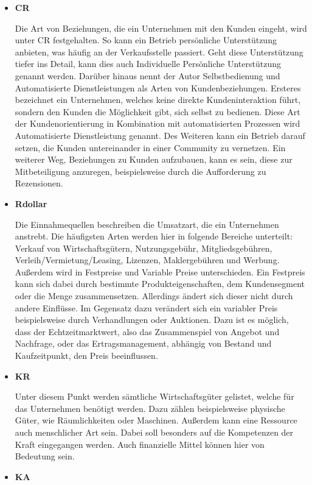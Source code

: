 \begin{itemize}
	\item \textbf{\ac{CR}}
	
	Die Art von Beziehungen, die ein Unternehmen mit den Kunden eingeht, wird unter \acs{CR} festgehalten. So kann ein Betrieb persönliche Unterstützung anbieten, was häufig an der Verkaufsstelle passiert. Geht diese Unterstützung tiefer ins Detail, kann dies auch Individuelle Persönliche Unterstützung genannt werden. Darüber hinaus nennt der Autor Selbstbedienung und Automatisierte Dienstleistungen als Arten von Kundenbeziehungen. Ersteres bezeichnet ein Unternehmen, welches keine direkte Kundeninteraktion führt, sondern den Kunden die Möglichkeit gibt, sich selbst zu bedienen. Diese Art der Kundenorientierung in Kombination mit automatisierten Prozessen wird Automatisierte Dienstleistung genannt. Des Weiteren kann ein Betrieb darauf setzen, die Kunden untereinander in einer Community zu vernetzen. Ein weiterer Weg, Beziehungen zu Kunden aufzubauen, kann es sein, diese zur Mitbeteiligung anzuregen, beispielsweise durch die Aufforderung zu Rezensionen.
	
	\item \textbf{\ac{Rdollar}}
	
	Die Einnahmequellen beschreiben die Umsatzart, die ein Unternehmen anstrebt. Die häufigsten Arten werden hier in folgende Bereiche unterteilt: Verkauf von Wirtschaftsgütern, Nutzungsgebühr, Mitgliedsgebühren, Verleih/Vermietung/Leasing, Lizenzen, Maklergebühren und Werbung. Außerdem wird in Festpreise und Variable Preise unterschieden. Ein Festpreis kann sich dabei durch bestimmte Produkteigenschaften, dem Kundensegment oder die Menge zusammensetzen. Allerdings ändert sich dieser nicht durch andere Einflüsse. Im Gegensatz dazu verändert sich ein variabler Preis beispielsweise durch Verhandlungen oder Auktionen. Dazu ist es möglich, dass der Echtzeitmarktwert, also das Zusammenspiel von Angebot und Nachfrage, oder das Ertragsmanagement, abhängig von Bestand und Kaufzeitpunkt, den Preis beeinflussen.
	
	
	\item \textbf{\ac{KR}}
	
	Unter diesem Punkt werden sämtliche Wirtschaftsgüter gelistet, welche für das Unternehmen benötigt werden. Dazu zählen beispielsweise physische Güter, wie Räumlichkeiten oder Maschinen. Außerdem kann eine Ressource auch menschlicher Art sein. Dabei soll besonders auf die Kompetenzen der Kraft eingegangen werden. Auch finanzielle Mittel können hier von Bedeutung sein.
	
	\item \textbf{\ac{KA}}
	

\end{itemize}
